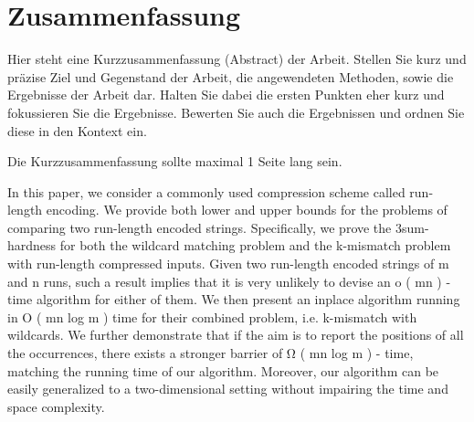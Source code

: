 \chapter*{Zusammenfassung}
Hier steht eine Kurzzusammenfassung (Abstract) der Arbeit. Stellen Sie kurz und präzise Ziel und Gegenstand der Arbeit, die angewendeten Methoden, sowie die Ergebnisse der Arbeit dar. Halten Sie dabei die ersten Punkten eher kurz und fokussieren Sie die Ergebnisse. Bewerten Sie auch die Ergebnissen und ordnen Sie diese in den Kontext ein.

Die Kurzzusammenfassung sollte maximal 1 Seite lang sein.

In this paper, we consider a commonly used compression scheme
called run-length encoding. We provide both lower and upper
bounds for the problems of comparing two run-length encoded
strings. Specifically, we prove the 3sum-hardness for both the
wildcard matching problem and the k-mismatch problem with
run-length compressed inputs. Given two run-length encoded
strings of m and n runs, such a result implies that it is very
unlikely to devise an o ( mn ) -time algorithm for either of them. We
then present an inplace algorithm running in O ( mn log m ) time
for their combined problem, i.e. k-mismatch with wildcards. We
further demonstrate that if the aim is to report the positions of
all the occurrences, there exists a stronger barrier of Ω ( mn log m ) -
time, matching the running time of our algorithm. Moreover, our
algorithm can be easily generalized to a two-dimensional setting
without impairing the time and space complexity.